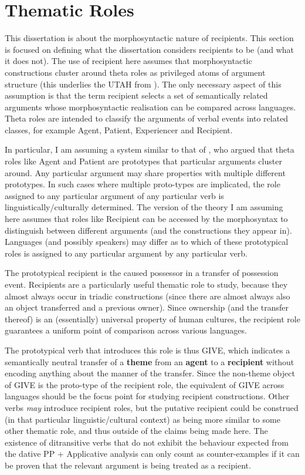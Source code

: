 \section{Thematic Roles}
This dissertation is about the morphosyntactic nature of recipients. This section is focused on defining what the dissertation considers recipients to be (and what it does not). The use of recipient here assumes that morphosyntactic constructions cluster around theta roles as privileged atoms of argument structure (this underlies the UTAH from \citealt{Baker.1988}). The only necessary aspect of this assumption is that the term recipient selects a set of semantically related arguments whose morphosyntactic realisation can be compared across languages. Theta roles are intended to classify the arguments of verbal events into related classes, for example Agent, Patient, Experiencer and Recipient. 

In particular, I am assuming a system similar to that of \cite{Dowty.1991}, who argued that theta roles like Agent and Patient are prototypes that particular arguments cluster around. Any particular argument may share properties with multiple different prototypes. In such cases where multiple proto-types are implicated, the role assigned to any particular argument of any particular verb is linguistically/culturally determined. The version of the theory I am assuming here assumes that roles like Recipient can be accessed by the morphosyntax to distinguish between different arguments (and the constructions they appear in). Languages (and possibly speakers) may differ as to which of these prototypical roles is assigned to any particular argument by any particular verb.

The prototypical recipient is the caused possessor in a transfer of possession event. Recipients are a particularly useful thematic role to study, because they almost always occur in triadic constructions (since there are almost always also an object transferred and a previous owner). Since ownership (and the transfer thereof) is an (essentially) universal property of human cultures, the recipient role guarantees a uniform point of comparison across various languages. 

The prototypical verb that introduces this role is thus GIVE, which indicates a semantically neutral transfer of a \textbf{theme} from an \textbf{agent} to a \textbf{recipient} without encoding anything about the manner of the transfer. Since the non-theme object of GIVE is the proto-type of the recipient role, the equivalent of GIVE across languages should be the focus point for studying recipient constructions. Other verbs \textit{may} introduce recipient roles, but the putative recipient could be construed (in that particular linguistic/cultural context) as being more similar to some other thematic role, and thus outside of the claims being made here. The existence of ditransitive verbs that do not exhibit the behaviour expected from the dative PP + Applicative analysis can only count as counter-examples if it can be proven that the relevant argument is being treated as a recipient.

